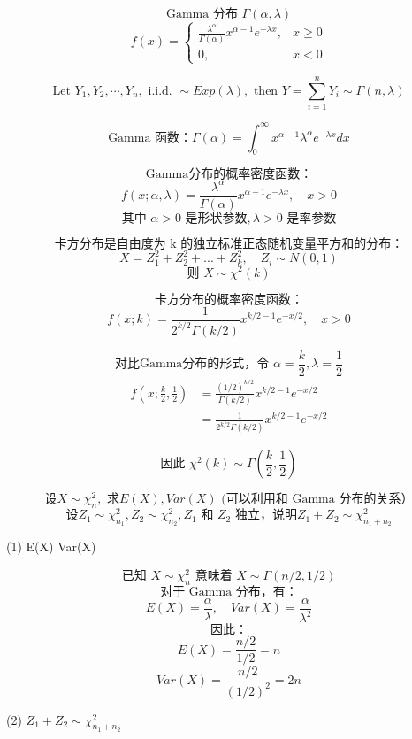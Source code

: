 \documentclass[UTF8]{report}
\theoremstyle{MyLineTheoremStyle} %
\theoremstyle{MyBlockTheoremStyle} %
\theoremstyle{MySubsubsectionStyle} %
\begin{document}
$$ \text{Gamma 分布 } \Gamma(\alpha, \lambda) $$
$$ f(x) = \begin{cases} 
\frac{\lambda^\alpha}{\Gamma(\alpha)} x^{\alpha-1} e^{-\lambda x}, & x \geq 0 \\
0, & x < 0
\end{cases} $$

$$ \text{Let } Y_1, Y_2, \cdots, Y_n, \text{ i.i.d. } \sim Exp(\lambda), \text{ then }
Y = \sum_{i=1}^n Y_i \sim \Gamma(n, \lambda) $$

$$ \text{Gamma 函数：} \Gamma(\alpha) = \int_0^\infty x^{\alpha-1}\lambda^\alpha e^{-\lambda x}dx $$

$$ \text{Gamma分布的概率密度函数：} $$
$$ f(x;\alpha,\lambda) = \frac{\lambda^\alpha}{\Gamma(\alpha)}x^{\alpha-1}e^{-\lambda x}, \quad x > 0 $$
$$ \text{其中 } \alpha > 0 \text{ 是形状参数}, \lambda > 0 \text{ 是率参数} $$

$$ \text{卡方分布是自由度为 k 的独立标准正态随机变量平方和的分布：} $$
$$ X = Z_1^2 + Z_2^2 + ... + Z_k^2, \quad Z_i \sim N(0,1) $$
$$ \text{则 } X \sim \chi^2(k) $$

$$ \text{卡方分布的概率密度函数：} $$
$$ f(x;k) = \frac{1}{2^{k/2}\Gamma(k/2)}x^{k/2-1}e^{-x/2}, \quad x > 0 $$

$$ \text{对比Gamma分布的形式，令 } \alpha = \frac{k}{2}, \lambda = \frac{1}{2} $$
$$ \begin{aligned}
f(x;\frac{k}{2},\frac{1}{2}) &= \frac{(1/2)^{k/2}}{\Gamma(k/2)}x^{k/2-1}e^{-x/2} \\
&= \frac{1}{2^{k/2}\Gamma(k/2)}x^{k/2-1}e^{-x/2}
\end{aligned} $$

$$ \text{因此 } \chi^2(k) \sim \Gamma(\frac{k}{2}, \frac{1}{2}) $$

$$ \text{设} X \sim \chi^2_n, \text{ 求} E(X), Var(X) \text{ (可以利用和 Gamma 分布的关系）} $$
$$ \text{设} Z_1 \sim \chi^2_{n_1}, Z_2 \sim \chi^2_{n_2}, Z_1 \text{ 和 } Z_2 \text{ 独立，说明} Z_1 + Z_2 \sim \chi^2_{n_1+n_2} $$


(1)  E(X)  Var(X)

$$ \text{已知 } X \sim \chi^2_n \text{ 意味着 } X \sim \Gamma(n/2, 1/2) $$
$$ \text{对于 Gamma 分布，有：} $$
$$ E(X) = \frac{\alpha}{\lambda}, \quad Var(X) = \frac{\alpha}{\lambda^2} $$
$$ \text{因此：} $$
$$ E(X) = \frac{n/2}{1/2} = n $$
$$ Var(X) = \frac{n/2}{(1/2)^2} = 2n $$

(2)  $Z_1 + Z_2 \sim \chi^2_{n_1+n_2}$
\end{document}
